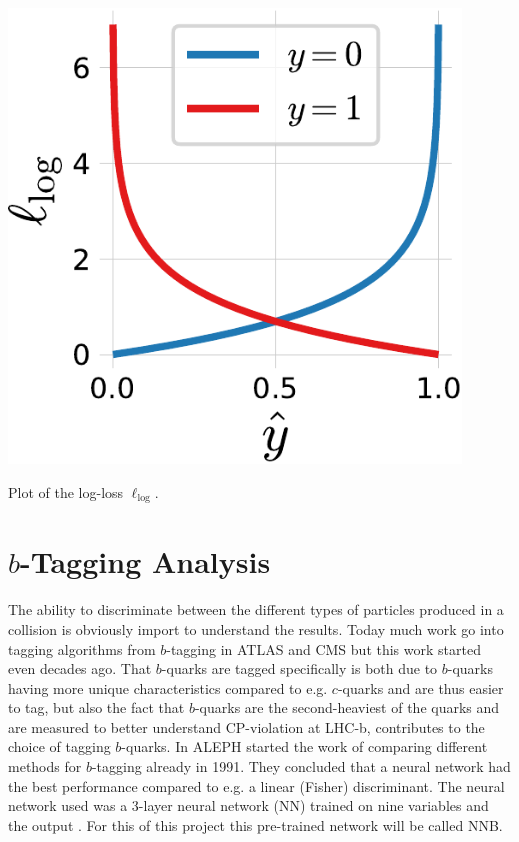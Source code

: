\begin{marginfigure}
  \includegraphics[draft=false, width=0.9\textwidth]{figures/log_loss_cross_entropy/logloss.pdf}
  \caption[Plot of the log-loss $\ell_\mathrm{log}$]
          {Plot of the log-loss $\ell_\mathrm{log}$.} 
  \label{fig:q:logloss}
\end{marginfigure}

\FloatBarrier
\section[b-Tagging Analysis]{$b$-Tagging Analysis}
\label{sec:q:b_tagging_analysis}

The ability to discriminate between the different types of particles produced in a collision is obviously import to understand the results. Today much work go into tagging algorithms from $b$-tagging in ATLAS and CMS \autocite{scodellaroTaggingATLASCMS2017} but this work started even decades ago. That $b$-quarks are tagged specifically is both due to $b$-quarks having more unique characteristics compared to e.g. $c$-quarks and are thus easier to tag, but also the fact that $b$-quarks are the second-heaviest of the quarks and are measured to better understand CP-violation at LHC-b, contributes to the choice of tagging $b$-quarks. In ALEPH \citet{proriolTAGGINGQUARKEVENTS1991} started the work of comparing different methods for $b$-tagging already in \num{1991}. They concluded that a neural network had the best performance compared to e.g. a linear (Fisher) discriminant. The neural network used was a 3-layer neural network (NN) trained on nine variables and the output . For this of this project this pre-trained network will be called NNB. 

